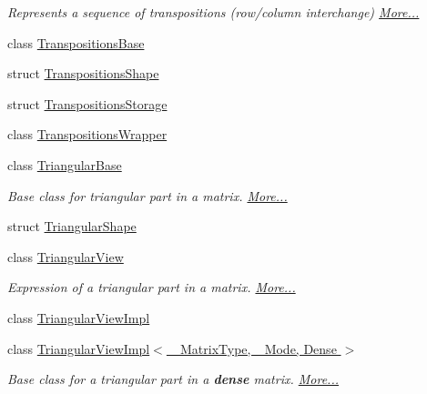 \begin{DoxyCompactItemize}
\begin{DoxyCompactList}\small\item\em Represents a sequence of transpositions (row/column interchange)  \hyperlink{group___core___module_class_eigen_1_1_transpositions}{More...}\end{DoxyCompactList}\item 
class \hyperlink{class_eigen_1_1_transpositions_base}{Transpositions\+Base}
\item 
struct \hyperlink{struct_eigen_1_1_transpositions_shape}{Transpositions\+Shape}
\item 
struct \hyperlink{struct_eigen_1_1_transpositions_storage}{Transpositions\+Storage}
\item 
class \hyperlink{class_eigen_1_1_transpositions_wrapper}{Transpositions\+Wrapper}
\item 
class \hyperlink{group___core___module_class_eigen_1_1_triangular_base}{Triangular\+Base}
\begin{DoxyCompactList}\small\item\em Base class for triangular part in a matrix.  \hyperlink{group___core___module_class_eigen_1_1_triangular_base}{More...}\end{DoxyCompactList}\item 
struct \hyperlink{struct_eigen_1_1_triangular_shape}{Triangular\+Shape}
\item 
class \hyperlink{group___core___module_class_eigen_1_1_triangular_view}{Triangular\+View}
\begin{DoxyCompactList}\small\item\em Expression of a triangular part in a matrix.  \hyperlink{group___core___module_class_eigen_1_1_triangular_view}{More...}\end{DoxyCompactList}\item 
class \hyperlink{class_eigen_1_1_triangular_view_impl}{Triangular\+View\+Impl}
\item 
class \hyperlink{group___core___module_class_eigen_1_1_triangular_view_impl_3_01___matrix_type_00_01___mode_00_01_dense_01_4}{Triangular\+View\+Impl$<$ \+\_\+\+Matrix\+Type, \+\_\+\+Mode, Dense $>$}
\begin{DoxyCompactList}\small\item\em Base class for a triangular part in a {\bfseries dense} matrix.  \hyperlink{group___core___module_class_eigen_1_1_triangular_view_impl_3_01___matrix_type_00_01___mode_00_01_dense_01_4}{More...}\end{DoxyCompactList}\item 

\end{DoxyCompactItemize}
